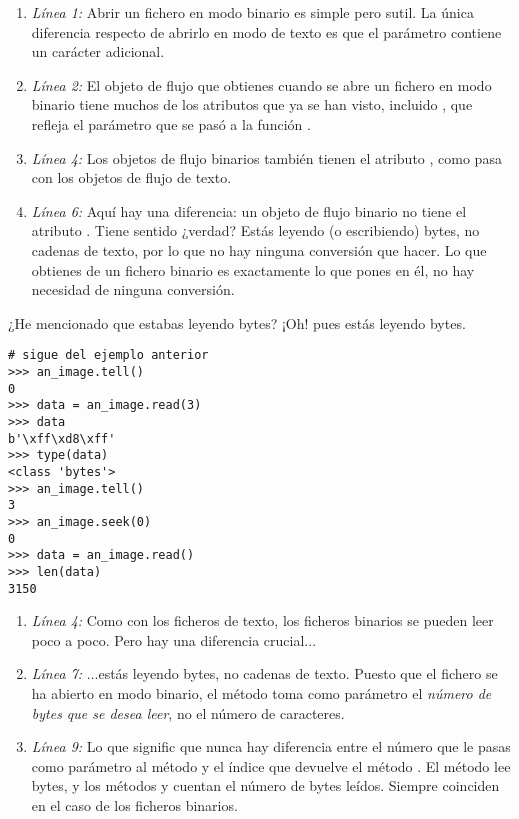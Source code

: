 \begin{enumerate}

\item \emph{Línea 1:} Abrir un fichero en modo binario es simple pero sutil. La única diferencia respecto de abrirlo en modo de texto es que el parámetro  contiene un carácter  adicional.

\item \emph{Línea 2:} El objeto de flujo que obtienes cuando se abre un fichero en modo binario tiene muchos de los atributos que ya se han visto, incluido , que refleja el parámetro  que se pasó a la función .

\item \emph{Línea 4:} Los objetos de flujo binarios también tienen el atributo , como pasa con los objetos de flujo de texto.

\item \emph{Línea 6:} Aquí hay una diferencia: un objeto de flujo binario no tiene el atributo . Tiene sentido ¿verdad? Estás leyendo (o escribiendo) bytes, no cadenas de texto, por lo que no hay ninguna conversión que hacer. Lo que obtienes de un fichero binario es exactamente lo que pones en él, no hay necesidad de ninguna conversión.

\end{enumerate}

¿He mencionado que estabas leyendo bytes? ¡Oh! pues estás leyendo bytes.

\noindent\begin{minipage}{\textwidth}
\begin{lstlisting}[mathescape=True]
# sigue del ejemplo anterior
>>> an_image.tell()
0
>>> data = an_image.read(3)
>>> data
b'\xff\xd8\xff'
>>> type(data)
<class 'bytes'>
>>> an_image.tell()
3
>>> an_image.seek(0)
0
>>> data = an_image.read()
>>> len(data)
3150
\end{lstlisting}
\end{minipage}

\begin{enumerate}

\item \emph{Línea 4:} Como con los ficheros de texto, los ficheros binarios se pueden leer poco a poco. Pero hay una diferencia crucial...

\item \emph{Línea 7:} ...estás leyendo bytes, no cadenas de texto. Puesto que el fichero se ha abierto en modo binario, el método  toma como parámetro el \emph{número de bytes que se desea leer}, no el número de caracteres.

\item \emph{Línea 9:} Lo que signific que nunca hay diferencia entre el número que le pasas como parámetro al método  y el índice que devuelve el método . El método  lee bytes, y los métodos  y  cuentan el número de bytes leídos. Siempre coinciden en el caso de los ficheros binarios.

\end{enumerate}

